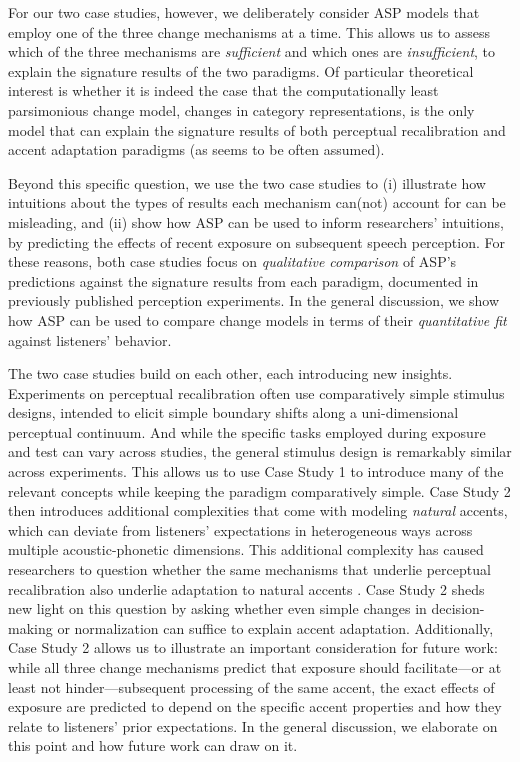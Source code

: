 \documentclass[
  11pt,
  man,floatsintext]{apa6}
\begin{document}
For our two case studies, however, we deliberately consider ASP models that employ one of the three change mechanisms at a time. This allows us to assess which of the three mechanisms are \emph{sufficient} and which ones are \emph{insufficient}, to explain the signature results of the two paradigms. Of particular theoretical interest is whether it is indeed the case that the computationally least parsimonious change model, changes in category representations, is the only model that can explain the signature results of both perceptual recalibration and accent adaptation paradigms (as seems to be often assumed).

Beyond this specific question, we use the two case studies to (i) illustrate how intuitions about the types of results each mechanism can(not) account for can be misleading, and (ii) show how ASP can be used to inform researchers' intuitions, by predicting the effects of recent exposure on subsequent speech perception. For these reasons, both case studies focus on \emph{qualitative comparison} of ASP's predictions against the signature results from each paradigm, documented in previously published perception experiments. In the general discussion, we show how ASP can be used to compare change models in terms of their \emph{quantitative fit} against listeners' behavior.

The two case studies build on each other, each introducing new insights. Experiments on perceptual recalibration often use comparatively simple stimulus designs, intended to elicit simple boundary shifts along a uni-dimensional perceptual continuum. And while the specific tasks employed during exposure and test can vary across studies, the general stimulus design is remarkably similar across experiments. This allows us to use Case Study 1 to introduce many of the relevant concepts while keeping the paradigm comparatively simple. Case Study 2 then introduces additional complexities that come with modeling \emph{natural} accents, which can deviate from listeners' expectations in heterogeneous ways across multiple acoustic-phonetic dimensions. This additional complexity has caused researchers to question whether the same mechanisms that underlie perceptual recalibration also underlie adaptation to natural accents \autocites[see recent reviews and discussions,][]{baeseberk2018,bent-baeseberk2021,zheng-samuel2020}. Case Study 2 sheds new light on this question by asking whether even simple changes in decision-making or normalization can suffice to explain accent adaptation. Additionally, Case Study 2 allows us to illustrate an important consideration for future work: while all three change mechanisms predict that exposure should facilitate---or at least not hinder---subsequent processing of the same accent, the exact effects of exposure are predicted to depend on the specific accent properties and how they relate to listeners' prior expectations. In the general discussion, we elaborate on this point and how future work can draw on it.
\end{document}
